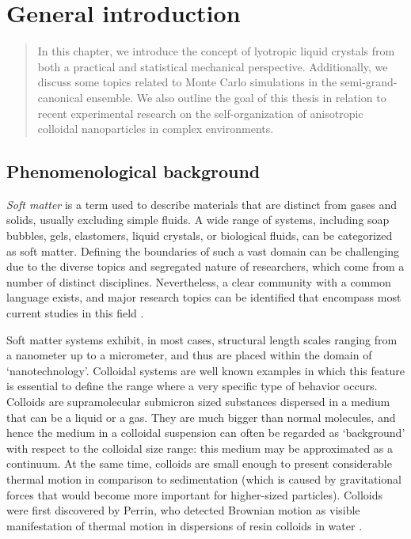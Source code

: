 
\chapter{General introduction}

\begin{abstract}
In this chapter, we introduce the concept of lyotropic liquid crystals from both a practical and statistical mechanical perspective. Additionally, we discuss some topics related to Monte Carlo simulations in the semi-grand-canonical ensemble. We also outline the goal of this thesis in relation to recent experimental research on the self-organization of anisotropic colloidal nanoparticles in complex environments.

\end{abstract}


\section{Phenomenological background}

{\em Soft matter} is a term used to describe materials that are distinct from gases and solids, usually excluding simple fluids. A wide range of systems, including soap bubbles, gels, elastomers, liquid crystals, or biological fluids, can be categorized as soft matter. Defining the boundaries of such a vast domain can be challenging due to the diverse topics and segregated nature of researchers, which come from a number of distinct disciplines. Nevertheless, a clear community with a common language exists, and major research topics can be identified that encompass most current studies in this field \cite{borsali2018soft}.

Soft matter systems exhibit, in most cases, structural length scales ranging from a nanometer up to a micrometer, and thus are placed within the domain of ‘nanotechnology’. Colloidal systems are well known examples in which this feature is essential to define the range where a very specific type of behavior occurs. Colloids are supramolecular submicron sized substances dispersed in a medium that can be a liquid or a gas. They are much bigger than normal molecules, and hence the medium in a colloidal suspension can often be regarded as ‘background’ with respect to the colloidal size range: this medium may be approximated as a continuum. At the same time, colloids are small enough to present considerable thermal motion in comparison to sedimentation (which is caused by gravitational forces that would become more important for higher-sized particles). Colloids were first discovered by Perrin, who detected Brownian motion as visible manifestation of thermal motion in dispersions of resin colloids in water \cite{perrin1913atomes}.

